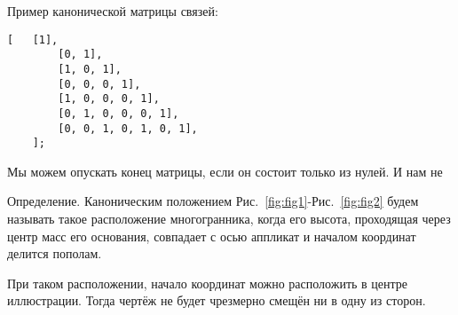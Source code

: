 Пример канонической матрицы связей:

\begin{lstlisting}[caption = {Каноническая матрица связей для параллелепипеда},numbers=none]
	[   [1],
	    [0, 1],
	    [1, 0, 1],
	    [0, 0, 0, 1],
	    [1, 0, 0, 0, 1],
	    [0, 1, 0, 0, 0, 1],
	    [0, 0, 1, 0, 1, 0, 1],
	];
\end{lstlisting}

Мы можем опускать конец матрицы, если он состоит только из нулей. И  нам не

Определение. Каноническим положением Рис.~\ref{fig:fig1}-Рис.~\ref{fig:fig2} будем называть такое расположение многогранника, когда его высота, проходящая через центр масс его основания, совпадает с осью аппликат и началом координат делится пополам.

При таком расположении, начало координат можно расположить в центре иллюстрации. Тогда чертёж не будет чрезмерно смещён ни в одну из сторон.

